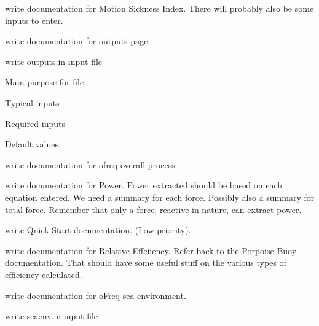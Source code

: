 \begin{DoxyRefList}
\begin{DoxyItemize}
\end{DoxyItemize}
\item[\label{todo__todo000027}%
\hypertarget{todo__todo000027}{}%
Page \hyperlink{local_msi}{Motion Sickness Index} ]write documentation for Motion Sickness Index. There will probably also be some inputs to enter. 
\item[\label{todo__todo000034}%
\hypertarget{todo__todo000034}{}%
Page \hyperlink{outputs}{Outputs} ]write documentation for outputs page. 
\item[\label{todo__todo000010}%
\hypertarget{todo__todo000010}{}%
Page \hyperlink{in_outputs}{Outputs.in Input File} ]write outputs.\-in input file
\begin{DoxyItemize}
\item Main purpose for file
\item Typical inputs
\item Required inputs
\item Default values. 
\end{DoxyItemize}
\item[\label{todo__todo000003}%
\hypertarget{todo__todo000003}{}%
Page \hyperlink{concept_overall}{Overall Process} ]write documentation for ofreq overall process. 
\item[\label{todo__todo000030}%
\hypertarget{todo__todo000030}{}%
Page \hyperlink{power}{Power} ]write documentation for Power. Power extracted should be based on each equation entered. We need a summary for each force. Possibly also a summary for total force. Remember that only a force, reactive in nature, can extract power. 
\item[\label{todo__todo000035}%
\hypertarget{todo__todo000035}{}%
Page \hyperlink{quick_start}{Quick Start} ]write Quick Start documentation. (Low priority). 
\item[\label{todo__todo000017}%
\hypertarget{todo__todo000017}{}%
Page \hyperlink{efficiency_relative}{Relative Efficiency} ]write documentation for Relative Effciiency. Refer back to the Porpoise Buoy documentation. That should have some useful stuff on the various types of efficiency calculated. 
\item[\label{todo__todo000004}%
\hypertarget{todo__todo000004}{}%
Page \hyperlink{concept_seaenv}{Sea Environment} ]write documentation for o\-Freq sea environment. 
\item[\label{todo__todo000011}%
\hypertarget{todo__todo000011}{}%
Page \hyperlink{in_seaenv}{Seaenv.in Input File} ]write seaenv.\-in input file
\begin{DoxyItemize}

\end{DoxyItemize}
\end{DoxyRefList}
